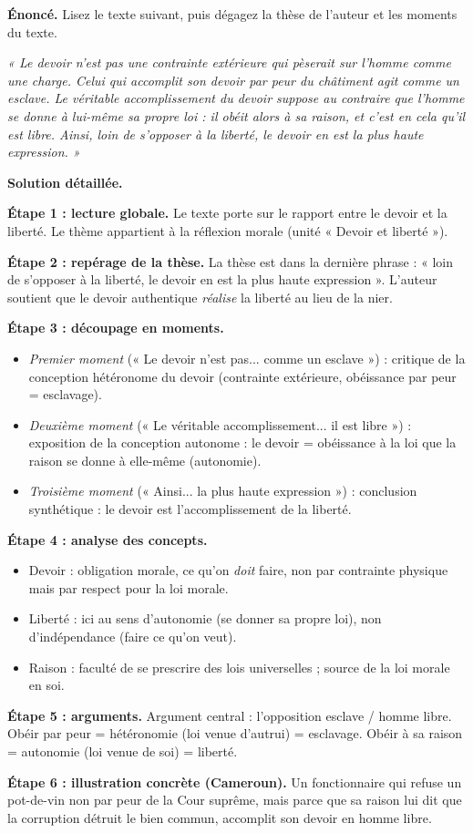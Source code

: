\documentclass[11pt]{article}
\newcommand{\cle}[1]{{\popxbold\color{popdark}#1}}
\begin{document}
\begin{exoresolu}
\textbf{Énoncé.} Lisez le texte suivant, puis dégagez la thèse de l'auteur et les moments du texte.

\emph{« Le devoir n'est pas une contrainte extérieure qui pèserait sur l'homme comme une charge. Celui qui accomplit son devoir par peur du châtiment agit comme un esclave. Le véritable accomplissement du devoir suppose au contraire que l'homme se donne à lui-même sa propre loi : il obéit alors à sa raison, et c'est en cela qu'il est libre. Ainsi, loin de s'opposer à la liberté, le devoir en est la plus haute expression. »}

\tcblower
\textbf{Solution détaillée.}

\textbf{Étape 1 : lecture globale.} Le texte porte sur le rapport entre le \cle{devoir} et la \cle{liberté}. Le thème appartient à la réflexion morale (unité « Devoir et liberté »).

\textbf{Étape 2 : repérage de la thèse.} La thèse est dans la dernière phrase : « loin de s'opposer à la liberté, le devoir en est la plus haute expression ». L'auteur soutient que le devoir authentique \emph{réalise} la liberté au lieu de la nier.

\textbf{Étape 3 : découpage en moments.}
\begin{itemize}
\item \emph{Premier moment} (« Le devoir n'est pas... comme un esclave ») : critique de la conception hétéronome du devoir (contrainte extérieure, obéissance par peur = esclavage).
\item \emph{Deuxième moment} (« Le véritable accomplissement... il est libre ») : exposition de la conception autonome : le devoir = obéissance à la loi que la raison se donne à elle-même (autonomie).
\item \emph{Troisième moment} (« Ainsi... la plus haute expression ») : conclusion synthétique : le devoir est l'accomplissement de la liberté.
\end{itemize}

\textbf{Étape 4 : analyse des concepts.}
\begin{itemize}
\item \cle{Devoir} : obligation morale, ce qu'on \emph{doit} faire, non par contrainte physique mais par respect pour la loi morale.
\item \cle{Liberté} : ici au sens d'\cle{autonomie} (se donner sa propre loi), non d'indépendance (faire ce qu'on veut).
\item \cle{Raison} : faculté de se prescrire des lois universelles ; source de la loi morale en soi.
\end{itemize}

\textbf{Étape 5 : arguments.} Argument central : l'opposition esclave / homme libre. Obéir par peur = hétéronomie (loi venue d'autrui) = esclavage. Obéir à sa raison = autonomie (loi venue de soi) = liberté.

\textbf{Étape 6 : illustration concrète (Cameroun).} Un fonctionnaire qui refuse un pot-de-vin non par peur de la Cour suprême, mais parce que sa raison lui dit que la corruption détruit le bien commun, accomplit son devoir en homme libre.
\end{exoresolu}
\end{document}
